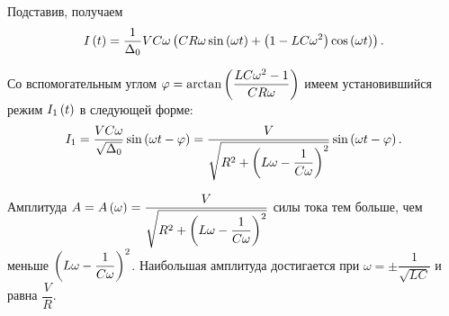 \documentclass[a5paper,10pt]{article}
\begin{document}
Подставив, получаем
$$I\left(t\right) = \frac{1}{\Delta_{0}} VC\omega \left(CR\omega \sin\left(\omega t\right) + \left(1 - LC\omega^2\right) \cos\left(\omega t\right)\right).$$

Со вспомогательным углом $\varphi = \arctan\left(\dfrac{LC\omega^2 - 1}{CR\omega}\right)$ имеем установившийся режим $I_{1}\left(t\right)$ в следующей форме:
$$I_{1} = \frac {VC\omega} {\sqrt{\Delta_{0}}} \sin\left(\omega t - \varphi\right) = \frac {V} {\sqrt{R^2 + \left(L\omega - \dfrac {1}{C\omega}\right)^2}} \sin\left(\omega t - \varphi\right).$$

Амплитуда $A = A\left(\omega\right) = \displaystyle{\frac {V} {\sqrt{R^2 + \left(L\omega - \dfrac {1}{C\omega}\right)^2}} }$ силы тока тем больше, чем меньше $\left(L\omega - \dfrac {1}{C\omega}\right)^2$. Наибольшая амплитуда достигается при $\omega = \pm \dfrac{1}{\sqrt{LC}}$ и равна $\dfrac {V} {R}$.
\end{document}
